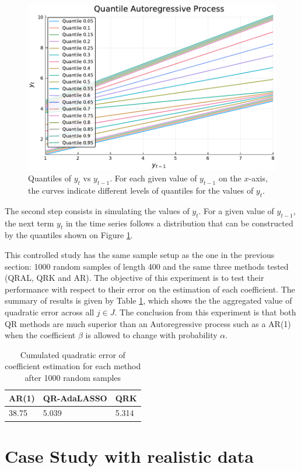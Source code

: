 \begin{figure}[h]
	\centering
	\centerline{\includegraphics[width=0.8\linewidth]{Images/Qar.pdf}}
	\caption{Quantiles of $y_t$ vs $y_{t-1}$. For each given value of $y_{t-1}$ on the $x$-axis, the curves indicate different levels of quantiles for the values of $y_t$.}
	\label{fig:qar}
\end{figure}

The second step consists in simulating the values of $y_t$. For a given value of $y_{t-1}$, the next term $y_t$ in the time series follows a distribution that can be constructed by the quantiles shown on Figure \ref{fig:qar}. 

This controlled study has the same sample setup as the one in the previous section: 1000 random samples of length 400 and the same three methods tested (QRAL, QRK and AR). The objective of this experiment is to test their performance with respect to their error on the estimation of each coefficient. The summary of results is given by Table \ref{tab:qar-results}, which shows the the aggregated value of quadratic error across all $j \in J$.
The conclusion from this experiment is that both QR methods are much superior than an Autoregressive process such as a AR(1) when the coefficient $\beta$ is allowed to change with probability $\alpha$. 


\begin{table}[h]
\centering
\caption{Cumulated quadratic error of coefficient estimation for each method after 1000 random samples}
\label{tab:qar-results}
\begin{tabular}{lll}
\hline
AR(1) & QR-AdaLASSO & QRK   \\ \hline
38.75 & 5.039       & 5.314
\end{tabular}
\end{table}

\section{Case Study with realistic data}

